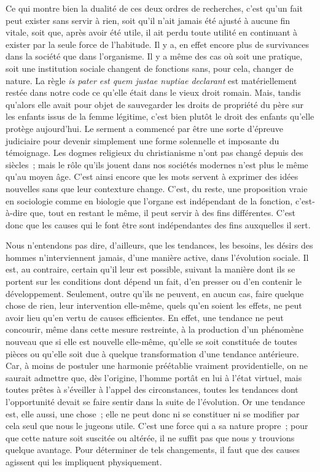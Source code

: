 \documentclass[french,twoside]{book} %
\begin{document}
Ce qui montre bien la dualité de ces deux ordres de recherches, c’est qu’un fait peut exister sans servir à rien, soit qu’il n’ait jamais été ajusté à aucune fin vitale, soit que, après avoir été utile, il ait perdu toute utilité en continuant à exister par la seule force de l’habitude. Il y a, en effet encore plus de survivances dans la société que dans l’organisme. Il y a même des cas où soit une pratique, soit une institution sociale changent de fonctions sans, pour cela, changer de nature. La règle \emph{is pater est quem justae nuptiae declarant} est matériellement restée dans notre code ce qu’elle était dans le vieux droit romain. Mais, tandis qu’alors elle avait pour objet de sauvegarder les droits de propriété du père sur les enfants issus de la femme légitime, c’est bien plutôt le droit des enfants qu’elle protège aujourd’hui. Le serment a commencé par être une sorte d’épreuve judiciaire pour devenir simplement une forme solennelle et imposante du témoignage. Les dogmes religieux du christianisme n’ont pas changé depuis des siècles ; mais le rôle qu’ils jouent dans nos sociétés modernes n’est plus le même qu’au moyen âge. C’est ainsi encore que les mots servent à exprimer des idées nouvelles sans que leur contexture change. C’est, du reste, une proposition vraie en sociologie comme en biologie que l’organe est indépendant de la fonction, c’est-à-dire que, tout en restant le même, il peut servir à des fins différentes. C’est donc que les causes qui le font être sont indépendantes des fins auxquelles il sert.\par
Nous n’entendons pas dire, d’ailleurs, que les tendances, les besoins, les désirs des hommes n’interviennent jamais, d’une manière active, dans l’évolution sociale. Il est, au contraire, certain qu’il leur est possible, suivant la manière dont ils se portent sur les conditions dont dépend un fait, d’en presser ou d’en contenir le développement. Seulement, outre qu’ils ne peuvent, en aucun cas, faire quelque chose de rien, leur intervention elle-même, quels qu’en soient les effets, ne peut avoir lieu qu’en vertu de causes efficientes. En effet, une tendance ne peut concourir, même dans cette mesure restreinte, à la production d’un phénomène nouveau que si elle est nouvelle elle-même, qu’elle se soit constituée de toutes pièces ou qu’elle soit due à quelque transformation d’une tendance antérieure. Car, à moins de postuler une harmonie préétablie vraiment providentielle, on ne saurait admettre que, dès l’origine, l’homme portât en lui à l’état virtuel, mais toutes prêtes à s’éveiller à l’appel des circonstances, toutes les tendances dont l’opportunité devait se faire sentir dans la suite de l’évolution. Or une tendance est, elle aussi, une chose ; elle ne peut donc ni se constituer ni se modifier par cela seul que nous le jugeons utile. C’est une force qui a sa nature propre ; pour que cette nature soit suscitée ou altérée, il ne suffit pas que nous y trouvions quelque avantage. Pour déterminer de tels changements, il faut que des causes agissent qui les impliquent physiquement.\par
\end{document}
